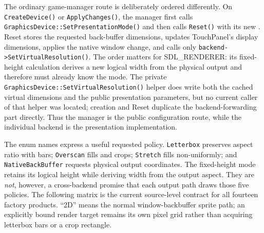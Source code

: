 The ordinary game-manager route is deliberately ordered differently.  On
\texttt{CreateDevice()} or \texttt{ApplyChanges()}, the manager first calls
\texttt{GraphicsDevice::SetPresentationMode()} and then calls \texttt{Reset()} with its new
.  Reset stores the requested back-buffer dimensions, updates
TouchPanel's display dimensions, applies the native window change, and calls only
\texttt{backend->SetVirtualResolution()}.  The order matters for SDL\_RENDERER: its
fixed-height calculation derives a new logical width from the physical output and therefore must
already know the mode.  The private \texttt{GraphicsDevice::SetVirtualResolution()} helper does
write both the cached virtual dimensions and the public presentation parameters, but no current
caller of that helper was located; creation and Reset duplicate the backend-forwarding part
directly.  Thus the manager is the public configuration route, while the individual backend is
the presentation implementation.

The enum names express a useful requested policy. \texttt{Letterbox} preserves aspect ratio with
bars; \texttt{Overscan} fills and crops; \texttt{Stretch} fills non-uniformly; and
\texttt{NativeBack\allowbreak Buffer} requests physical output coordinates. The fixed-height
mode retains its logical height while deriving width from the output aspect. They are \emph{not},
however, a cross-backend promise that each output path draws those five policies. The following
matrix is the current source-level
contract for all fourteen factory products.  ``2D'' means the normal window-backbuffer sprite
path; an explicitly bound render target remains its own pixel grid rather than acquiring
letterbox bars or a crop rectangle.

